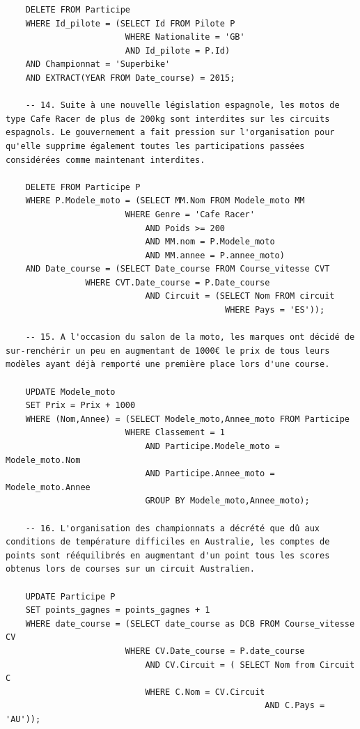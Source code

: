 \documentclass[12pt,a4paper]{article}
\newenvironment{code}{\captionsetup{type=listing}}{}
\begin{document}
\begin{code}
\begin{verbatim}
    DELETE FROM Participe
    WHERE Id_pilote = (SELECT Id FROM Pilote P
                        WHERE Nationalite = 'GB'
                        AND Id_pilote = P.Id)
    AND Championnat = 'Superbike'
    AND EXTRACT(YEAR FROM Date_course) = 2015;
    
    -- 14. Suite à une nouvelle législation espagnole, les motos de type Cafe Racer de plus de 200kg sont interdites sur les circuits espagnols. Le gouvernement a fait pression sur l'organisation pour qu'elle supprime également toutes les participations passées considérées comme maintenant interdites.
    
    DELETE FROM Participe P
    WHERE P.Modele_moto = (SELECT MM.Nom FROM Modele_moto MM
                        WHERE Genre = 'Cafe Racer'
                            AND Poids >= 200
                            AND MM.nom = P.Modele_moto
                            AND MM.annee = P.annee_moto)
    AND Date_course = (SELECT Date_course FROM Course_vitesse CVT
                WHERE CVT.Date_course = P.Date_course
                            AND Circuit = (SELECT Nom FROM circuit
                                            WHERE Pays = 'ES'));
                                            
    -- 15. A l'occasion du salon de la moto, les marques ont décidé de sur-renchérir un peu en augmentant de 1000€ le prix de tous leurs modèles ayant déjà remporté une première place lors d'une course.

    UPDATE Modele_moto
    SET Prix = Prix + 1000
    WHERE (Nom,Annee) = (SELECT Modele_moto,Annee_moto FROM Participe
                        WHERE Classement = 1
                            AND Participe.Modele_moto = Modele_moto.Nom
                            AND Participe.Annee_moto = Modele_moto.Annee
                            GROUP BY Modele_moto,Annee_moto);
                            
    -- 16. L'organisation des championnats a décrété que dû aux conditions de température difficiles en Australie, les comptes de points sont rééquilibrés en augmentant d'un point tous les scores obtenus lors de courses sur un circuit Australien.

    UPDATE Participe P
    SET points_gagnes = points_gagnes + 1
    WHERE date_course = (SELECT date_course as DCB FROM Course_vitesse CV
                        WHERE CV.Date_course = P.date_course
                            AND CV.Circuit = ( SELECT Nom from Circuit C
                            WHERE C.Nom = CV.Circuit
                                                    AND C.Pays = 'AU'));
    

\end{verbatim}
\end{code}
\end{document}
